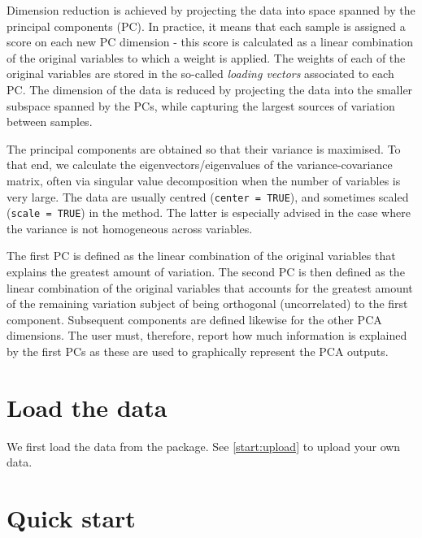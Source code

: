 \documentclass[]{book}
\newenvironment{Shaded}{\begin{snugshade}}{\end{snugshade}}
\newcommand{\KeywordTok}[1]{\textcolor[rgb]{0.13,0.29,0.53}{\textbf{#1}}}
\newcommand{\NormalTok}[1]{#1}
\newcommand{\OperatorTok}[1]{\textcolor[rgb]{0.81,0.36,0.00}{\textbf{#1}}}
\newcommand{\StringTok}[1]{\textcolor[rgb]{0.31,0.60,0.02}{#1}}
\begin{document}
Dimension reduction is achieved by projecting the data into space spanned by the principal components (PC). In practice, it means that each sample is assigned a score on each new PC dimension - this score is calculated as a linear combination of the original variables to which a weight is applied. The weights of each of the original variables are stored in the so-called \emph{loading vectors} associated to each PC. The dimension of the data is reduced by projecting the data into the smaller subspace spanned by the PCs, while capturing the largest sources of variation between samples.

The principal components are obtained so that their variance is maximised. To that end, we calculate the eigenvectors/eigenvalues of the variance-covariance matrix, often via singular value decomposition when the number of variables is very large. The data are usually centred (\texttt{center\ =\ TRUE}), and sometimes scaled (\texttt{scale\ =\ TRUE}) in the method. The latter is especially advised in the case where the variance is not homogeneous across variables.

The first PC is defined as the linear combination of the original variables that explains the greatest amount of variation. The second PC is then defined as the linear combination of the original variables that accounts for the greatest amount of the remaining variation subject of being orthogonal (uncorrelated) to the first component. Subsequent components are defined likewise for the other PCA dimensions. The user must, therefore, report how much information is explained by the first PCs as these are used to graphically represent the PCA outputs.

\hypertarget{load-the-data}{%
\section{Load the data}\label{load-the-data}}

We first load the data from the package. See \ref{start:upload} to upload your own data.

\begin{Shaded}
\end{Shaded}

\hypertarget{quick-start}{%
\section{Quick start}\label{quick-start}}
\end{document}
